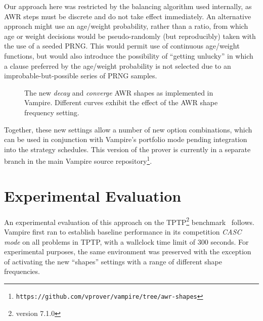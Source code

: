 \documentclass{llncs}
\begin{document}
Our approach here was restricted by the balancing algorithm used internally, as AWR steps must be discrete and do not take effect immediately.
An alternative approach might use an age/weight probability, rather than a ratio, from which age or weight decisions would be pseudo-randomly (but reproducibly) taken with the use of a seeded PRNG.
This would permit use of continuous age/weight functions, but would also introduce the possibility of ``getting unlucky'' in which a clause preferred by the age/weight probability is not selected due to an improbable-but-possible series of PRNG samples.

\begin{figure}
	\caption{The new \emph{decay} and \emph{converge} AWR shapes as implemented in Vampire. Different curves exhibit the effect of the AWR shape frequency setting.}
	\label{fig:decay-and-converge}
\end{figure}

Together, these new settings allow a number of new option combinations, which can be used in conjunction with Vampire's portfolio mode pending integration into the strategy schedules.
This version of the prover is currently in a separate branch in the main Vampire source repository\footnote{\texttt{https://github.com/vprover/vampire/tree/awr-shapes}}.

\section{Experimental Evaluation}
\label{sec:experiments}
An experimental evaluation of this approach on the TPTP\footnote{version 7.1.0} benchmark~\cite{tptp} follows.
Vampire first ran to establish baseline performance in its competition \emph{CASC mode} on all problems in TPTP, with a wallclock time limit of 300 seconds.
For experimental purposes, the same environment was preserved with the exception of activating the new ``shapes'' settings with a range of different shape frequencies.
\end{document}
